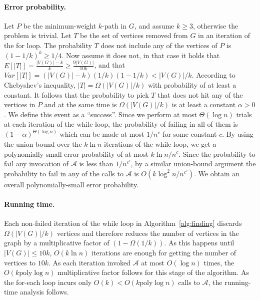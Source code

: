\documentclass{llncs}
\newcommand{\poly}{\mathrm{poly}}
\newcommand{\abs}[1]{\lvert #1 \rvert}
\begin{document}
\paragraph{Error probability.} Let $P$ be the minimum-weight $k$-path in $G$, and assume $k \geq 3$, otherwise the problem is trivial.
Let $T$ be the set of vertices removed from $G$ in an iteration of the for loop. 
The probability $T$ does not include any of the vertices of $P$ is $(1-1/k)^k \geq 1/4$. Now assume it does not, in that case it holds that $E[\abs{T}] = \frac{\abs{V(G)}-k}{k} \geq \frac{9\abs{V(G)}}{10k}$, and that $Var[\abs{T}]=(\abs{V(G)}-k)(1/k)(1-1/k) < \abs{V(G)}/k$. According to Chebyshev's inequality, $\abs{T} = \Omega (\abs{V(G)}/k)$ with probability of at least a constant. It follows that the probability to pick $T$ that does not hit any of the vertices in $P$ and at the same time is $\Omega (\abs{V(G)}/k)$ is at least a constant $\alpha > 0$. 
We define this event as a ``success''. Since we perform at most $\Theta(\log n)$ trials at each iteration of the while loop, the probability of failing in all of them is $(1-\alpha)^{\Theta(\log n)}$ which can be made at most  $ 1/n^c$ for some constant $c$. By using the union-bound over the $k \ln n$ iterations of the while loop, we get a polynomially-small error probability of at most $k \ln n / n^c$. Since the probability to fail any invocation of $\mathcal{A}$ is less than $1 / n^{c'}$, by a similar union-bound argument the probability to fail in any of the calls to $\mathcal{A}$ is  $O(k \log^2 n / n^{c'})$. We obtain an overall polynomially-small error probability.

\paragraph{Running time.} Each non-failed iteration of the while loop in Algorithm~\ref{alg:finding} discards $\Omega(\abs{V(G)}/k)$ vertices and therefore reduces the number of vertices in the graph by a multiplicative factor of $(1-\Omega(1/k))$. As this happens until $\abs{V(G)} \leq 10k$, $O(k\ln n)$ iterations are enough for getting the number of vertices to $10k$.
As each iteration invoked $\mathcal{A}$ at most $O(\log n)$ times, the $O(k \poly\log n)$ multiplicative factor follows for this stage of the algorithm. As the for-each loop incurs only $O(k) < O(k \poly\log n)$ calls to $\mathcal{A}$, the running-time analysis follows.
\end{document}
